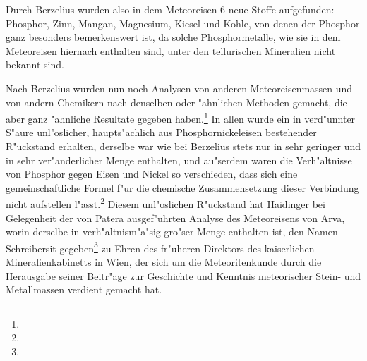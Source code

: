 \documentclass[a4paper, 11pt, oneside]{article}
\begin{document}
Durch Berzelius wurden also in dem Meteoreisen 6 neue Stoffe aufgefunden: Phosphor, Zinn, Mangan, Magnesium, Kiesel und Kohle, von denen der Phosphor ganz besonders bemerkenswert ist, da solche Phosphormetalle, wie sie in dem Meteoreisen hiernach enthalten sind, unter den tellurischen Mineralien nicht bekannt sind.

Nach Berzelius wurden nun noch Analysen von anderen Meteoreisenmassen und von andern Chemikern nach denselben oder "ahnlichen Methoden gemacht, die aber ganz "ahnliche Resultate gegeben haben.\footnote{} In allen wurde ein in verd"unnter S"aure unl"oslicher, haupts"achlich aus Phosphornickeleisen bestehender R"uckstand erhalten, derselbe war wie bei Berzelius stets nur in sehr geringer und in sehr ver"anderlicher Menge enthalten, und au"serdem waren die Verh"altnisse von Phosphor gegen Eisen und Nickel so verschieden, dass sich eine gemeinschaftliche Formel f"ur die chemische Zusammensetzung dieser Verbindung nicht aufstellen l"asst.\footnote{} Diesem unl"oslichen R"uckstand hat Haidinger bei Gelegenheit der von Patera ausgef"uhrten Analyse des Meteoreisens von Arva, worin derselbe in verh"altnism"a"sig gro"ser Menge enthalten ist, den Namen Schreibersit gegeben\footnote{} zu Ehren des fr"uheren Direktors des kaiserlichen Mineralienkabinetts in Wien, der sich um die Meteoritenkunde durch die Herausgabe seiner Beitr"age zur Geschichte und Kenntnis meteorischer Stein- und Metallmassen verdient gemacht hat.
\end{document}
